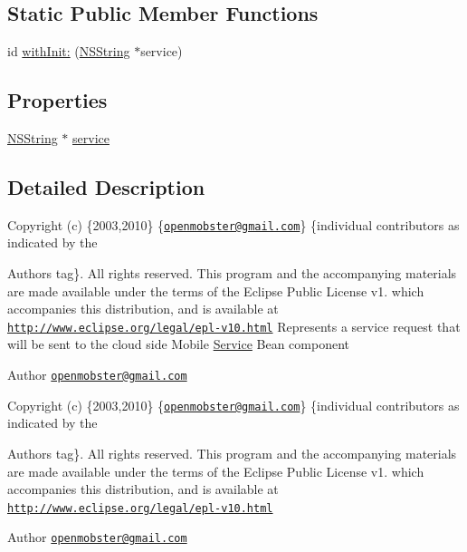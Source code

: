 \subsection*{\-Static \-Public \-Member \-Functions}
\begin{DoxyCompactItemize}
\item 
id \hyperlink{interface_request_a2a1bf25de9bc9de1b31b09c2c19c07b7}{with\-Init\-:} (\hyperlink{class_n_s_string}{\-N\-S\-String} $\ast$service)
\end{DoxyCompactItemize}
\subsection*{\-Properties}
\begin{DoxyCompactItemize}
\item 
\hyperlink{class_n_s_string}{\-N\-S\-String} $\ast$ \hyperlink{interface_request_a9bc63cab41bd9c57afdb8b590f1b65c2}{service}
\end{DoxyCompactItemize}


\subsection{\-Detailed \-Description}
\-Copyright (c) \{2003,2010\} \{\href{mailto:openmobster@gmail.com}{\tt openmobster@gmail.\-com}\} \{individual contributors as indicated by the \begin{DoxyAuthor}{\-Authors}
tag\}. \-All rights reserved. \-This program and the accompanying materials are made available under the terms of the \-Eclipse \-Public \-License v1. which accompanies this distribution, and is available at \href{http://www.eclipse.org/legal/epl-v10.html}{\tt http\-://www.\-eclipse.\-org/legal/epl-\/v10.\-html} \-Represents a service request that will be sent to the cloud side \-Mobile \hyperlink{interface_service}{\-Service} \-Bean component
\end{DoxyAuthor}
\begin{DoxyAuthor}{\-Author}
\href{mailto:openmobster@gmail.com}{\tt openmobster@gmail.\-com}
\end{DoxyAuthor}
\-Copyright (c) \{2003,2010\} \{\href{mailto:openmobster@gmail.com}{\tt openmobster@gmail.\-com}\} \{individual contributors as indicated by the \begin{DoxyAuthor}{\-Authors}
tag\}. \-All rights reserved. \-This program and the accompanying materials are made available under the terms of the \-Eclipse \-Public \-License v1. which accompanies this distribution, and is available at \href{http://www.eclipse.org/legal/epl-v10.html}{\tt http\-://www.\-eclipse.\-org/legal/epl-\/v10.\-html}
\end{DoxyAuthor}
\begin{DoxyAuthor}{\-Author}
\href{mailto:openmobster@gmail.com}{\tt openmobster@gmail.\-com} 
\end{DoxyAuthor}


